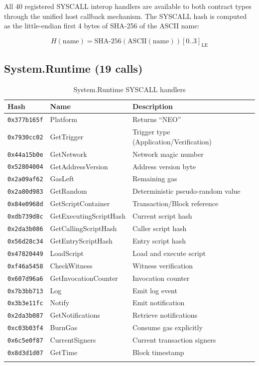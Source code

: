 \documentclass[11pt,a4paper]{article}
\begin{document}
All 40 registered SYSCALL interop handlers are available to both contract
types through the unified host callback mechanism. The SYSCALL hash is
computed as the little-endian first 4 bytes of SHA-256 of the ASCII name:

\begin{equation}
H(\text{name}) = \text{SHA-256}(\text{ASCII}(\text{name}))[0..3]_{\text{LE}}
\label{eq:syscall-hash}
\end{equation}

\subsection{System.Runtime (19 calls)}

\begin{longtable}{@{}lp{3.5cm}p{5.5cm}@{}}
\toprule
\textbf{Hash} & \textbf{Name} & \textbf{Description} \\
\midrule
\endhead
\texttt{0x377b165f} & Platform & Returns ``NEO'' \\
\texttt{0x7930cc02} & GetTrigger & Trigger type (Application/Verification) \\
\texttt{0x44a15b0e} & GetNetwork & Network magic number \\
\texttt{0x52804004} & GetAddressVersion & Address version byte \\
\texttt{0x2a09af62} & GasLeft & Remaining gas \\
\texttt{0x2a80d983} & GetRandom & Deterministic pseudo-random value \\
\texttt{0x84e0968d} & GetScriptContainer & Transaction/Block reference \\
\texttt{0xdb739d8c} & GetExecutingScriptHash & Current script hash \\
\texttt{0x2da3b086} & GetCallingScriptHash & Caller script hash \\
\texttt{0x56d28c34} & GetEntryScriptHash & Entry script hash \\
\texttt{0x47820449} & LoadScript & Load and execute script \\
\texttt{0xf46a5458} & CheckWitness & Witness verification \\
\texttt{0x607d96a6} & GetInvocationCounter & Invocation counter \\
\texttt{0x7b3bb713} & Log & Emit log event \\
\texttt{0x3b3e11fc} & Notify & Emit notification \\
\texttt{0x2da3b087} & GetNotifications & Retrieve notifications \\
\texttt{0xc03b03f4} & BurnGas & Consume gas explicitly \\
\texttt{0x6c5e0f87} & CurrentSigners & Current transaction signers \\
\texttt{0x8d3d1d07} & GetTime & Block timestamp \\
\bottomrule
\caption{System.Runtime SYSCALL handlers}
\end{longtable}
\end{document}
